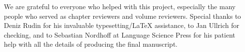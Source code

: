 
We are grateful to everyone who helped with this project, especially the many people who served as chapter reviewers and volume reviewers. Special thanks to Deniz Rudin for his invaluable typesetting/LaTeX assistance, to Jan Ullrich for  checking, and to Sebastian Nordhoff at Language Science Press for his patient help with all the details of producing the final manuscript. 
  

